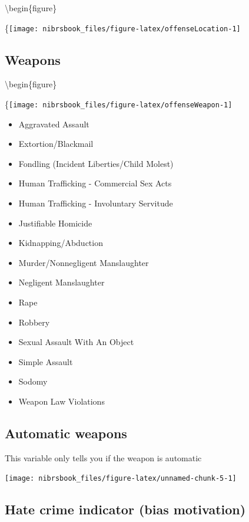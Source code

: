\documentclass[
  12pt,
  openany]{book}
\providecommand{\tightlist}{%
  \setlength{\itemsep}{0pt}\setlength{\parskip}{0pt}}
\begin{document}
\textbackslash begin\{figure\}

\{\centering \texttt{[image: nibrsbook\_files/figure-latex/offenseLocation-1]}

\hypertarget{weapons}{%
\subsection{Weapons}\label{weapons}}

\textbackslash begin\{figure\}

\{\centering \texttt{[image: nibrsbook\_files/figure-latex/offenseWeapon-1]}

\begin{itemize}
\tightlist
\item
  Aggravated Assault
\item
  Extortion/Blackmail
\item
  Fondling (Incident Liberties/Child Molest)
\item
  Human Trafficking - Commercial Sex Acts
\item
  Human Trafficking - Involuntary Servitude
\item
  Justifiable Homicide
\item
  Kidnapping/Abduction
\item
  Murder/Nonnegligent Manslaughter
\item
  Negligent Manslaughter
\item
  Rape
\item
  Robbery
\item
  Sexual Assault With An Object
\item
  Simple Assault
\item
  Sodomy
\item
  Weapon Law Violations
\end{itemize}

\hypertarget{automatic-weapons}{%
\subsection{Automatic weapons}\label{automatic-weapons}}

This variable only tells you if the weapon is automatic

\begin{center}\texttt{[image: nibrsbook\_files/figure-latex/unnamed-chunk-5-1]} \end{center}

\hypertarget{hate-crime-indicator-bias-motivation}{%
\subsection{Hate crime indicator (bias motivation)}\label{hate-crime-indicator-bias-motivation}}
\end{document}
